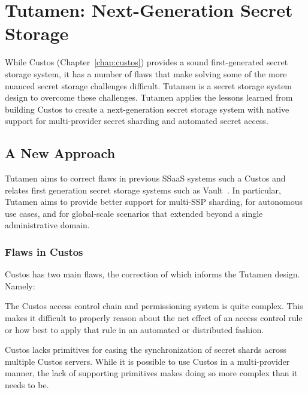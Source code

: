 \chapter{Tutamen: Next-Generation Secret Storage}
\label{chap:tutamen}

While Custos (Chapter~\ref{chap:custos}) provides a sound
first-generated secret storage system, it has a number of flaws that
make solving some of the more nuanced secret storage challenges
difficult. Tutamen is a secret storage system design to overcome these
challenges. Tutamen applies the lessons learned from building Custos
to create a next-generation secret storage system with native support
for multi-provider secret sharding and automated secret access.

\section{A New Approach}
\label{chap:tutamen:new}

Tutamen aims to correct flaws in previous SSaaS systems such a Custos
and relates first generation secret storage systems such as
Vault~\cite{vault}. In particular, Tutamen aims to provide better
support for multi-SSP sharding, for autonomous use cases, and for
global-scale scenarios that extended beyond a single administrative
domain.

\subsection{Flaws in Custos}

Custos has two main flaws, the correction of which informs the Tutamen
design. Namely:

\begin{packed_item}
\item The Custos access control chain and permissioning system is
  quite complex. This makes it difficult to properly reason about the
  net effect of an access control rule or how best to apply that rule
  in an automated or distributed fashion.
\item Custos lacks primitives for easing the synchronization of secret
  shards across multiple Custos servers. While it is possible to use
  Custos in a multi-provider manner, the lack of supporting primitives
  makes doing so more complex than it needs to be.
\end{packed_item}

